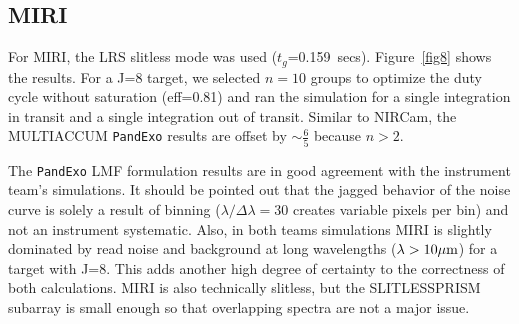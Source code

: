 \documentclass[iop]{emulateapj}
\begin{document}
\subsection{MIRI}
For MIRI, the LRS slitless mode was used ($t_g$=0.159~secs). Figure~\ref{fig8} shows the results. For a J=8 target, we selected $n=10$ groups to optimize the duty cycle without saturation (eff=0.81) and ran the simulation for a single integration in transit and a single integration out of transit. Similar to NIRCam, the MULTIACCUM \texttt{PandExo} results are offset by $\sim \frac{6}{5}$ because $n>2$. 

The \texttt{PandExo} LMF formulation results are in good agreement with the instrument team's simulations. It should be pointed out that the jagged behavior of the noise curve is solely a result of binning ($\lambda/\Delta \lambda = 30$ creates variable pixels per bin) and not an instrument systematic. Also, in both teams simulations MIRI is slightly dominated by read noise and background at long wavelengths ($\lambda>10\mbox{$\mu$m}$) for a target with J=8. This adds another high degree of certainty to the correctness of both calculations. MIRI is also technically slitless, but the SLITLESSPRISM subarray is small enough so that overlapping spectra are not a major issue.
\end{document}
